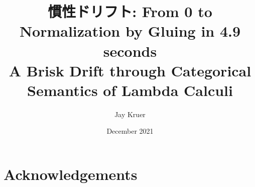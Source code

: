 \documentclass[12pt,twoside]{reedthesis}
\title{慣性ドリフト: From 0 to Normalization by Gluing in 4.9 seconds\\ A Brisk Drift through Categorical Semantics of Lambda Calculi}
\author{Jay Kruer}
\date{December 2021}
\theoremstyle{definition}
\theoremstyle{remark}
\theoremstyle{plain}
\begin{document}
\maketitle
\frontmatter %
\pagestyle{empty} %

\chapter*{Acknowledgements}








\end{document}
